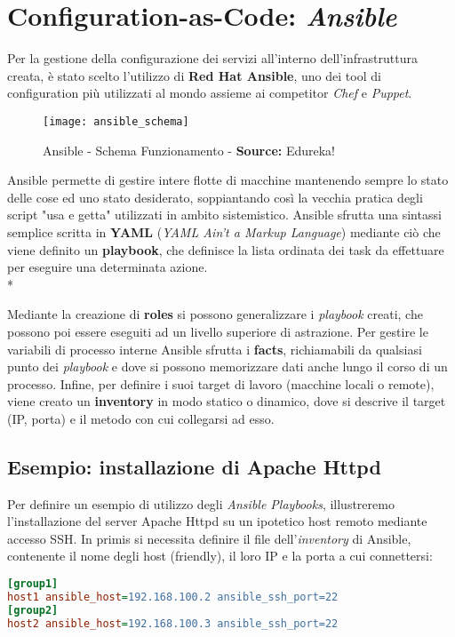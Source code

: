 \documentclass[../main.tex]{subfiles}
\begin{document}
    	\section{Configuration-as-Code: \emph{Ansible}}
    	
    	    Per la gestione della configurazione dei servizi all'interno dell'infrastruttura creata, è stato scelto l'utilizzo di \textbf{Red Hat Ansible}\cite{ansible}, uno dei tool di configuration più utilizzati al mondo assieme ai competitor \emph{Chef} e \emph{Puppet}.
    	    
    	    \begin{figure}[H]
    			\centering
    			\texttt{[image: ansible\_schema]}
    			\caption{Ansible - Schema Funzionamento - \textbf{Source:} Edureka!}
    			\label{fig:ansible_schema}
    	    \end{figure}
    	    
    	    Ansible permette di gestire intere flotte di macchine mantenendo sempre lo stato delle cose ed uno stato desiderato, soppiantando così la vecchia pratica degli script "usa e getta" utilizzati in ambito sistemistico. Ansible sfrutta una sintassi semplice scritta in \textbf{YAML} (\emph{YAML Ain't a Markup Language}) mediante ciò che viene definito un \textbf{playbook}, che definisce la lista ordinata dei task da effettuare per eseguire una determinata azione.\\*
    	    
    	    Mediante la creazione di \textbf{roles} si possono generalizzare i \emph{playbook} creati, che possono poi essere eseguiti ad un livello superiore di astrazione. Per gestire le variabili di processo interne Ansible sfrutta i \textbf{facts}, richiamabili da qualsiasi punto dei \emph{playbook} e dove si possono memorizzare dati anche lungo il corso di un processo. Infine, per definire i suoi target di lavoro (macchine locali o remote), viene creato un \textbf{inventory} in modo statico o dinamico, dove si descrive il target (IP, porta) e il metodo con cui collegarsi ad esso.
    	    
    	    \subsection{Esempio: installazione di Apache Httpd}
    	    
    	        Per definire un esempio di utilizzo degli \emph{Ansible Playbooks}, illustreremo l'installazione del server Apache Httpd su un ipotetico host remoto mediante accesso SSH. In primis si necessita definire il file dell'\emph{inventory} di Ansible, contenente il nome degli host (friendly), il loro IP e la porta a cui connettersi:
    	        \begin{lstlisting}[language={Ini}]
[group1]
host1 ansible_host=192.168.100.2 ansible_ssh_port=22
[group2]
host2 ansible_host=192.168.100.3 ansible_ssh_port=22
    	        \end{lstlisting}
    	        
\end{document}
